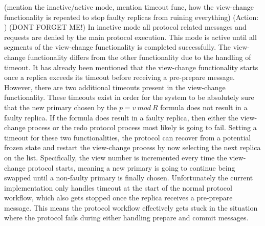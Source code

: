 (mention the inactive/active mode, mention timeout func, how the view-change functionality is repeated to stop faulty replicas from ruining everything)
(Action: )
(DONT FORGET ME!)
In inactive mode all protocol related messages and requests are denied by the main protocol execution. This mode is active until all segments of the view-change functionality is completed successfully. The view-change functionality differs from the other functionality due to the handling of timeout. It has already been mentioned that the view-change functionality starts once a replica exceeds its timeout before receiving a pre-prepare message. However, there are two additional timeouts present in the view-change functionality. These timeouts exist in order for the system to be absolutely sure that the new primary chosen by the $p = v ~mod~ R$ formula does not result in a faulty replica. If the formula does result in a faulty replica, then either the view-change process or the redo protocol process most likely is going to fail. Setting a timeout for these two functionalities, the protocol can recover from a potential frozen state and restart the view-change process by now selecting the next replica on the list. Specifically, the view number is incremented every time the view-change protocol starts, meaning a new primary is going to continue being swapped until a non-faulty primary is finally chosen. Unfortunately the current implementation only handles timeout at the start of the normal protocol workflow, which also gets stopped once the replica receives a pre-prepare message. This means the protocol workflow effectively gets stuck in the situation where the protocol fails during either handling prepare and commit messages. 

